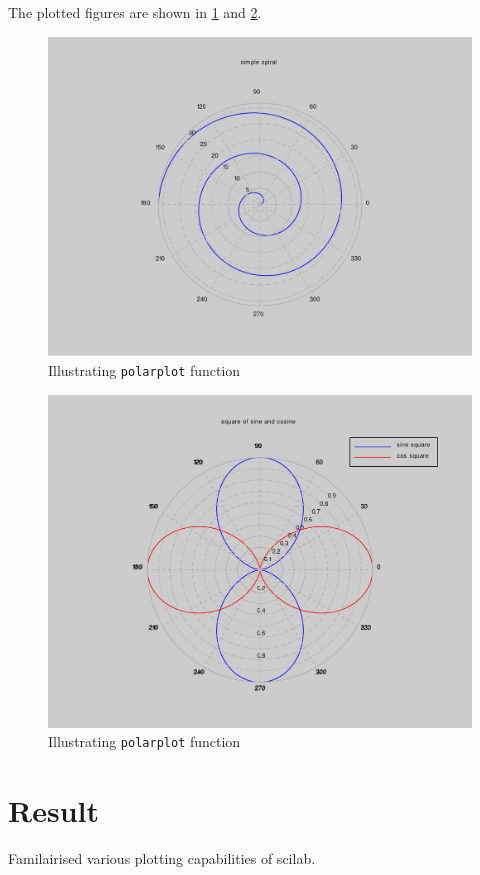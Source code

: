 The plotted figures are shown in \ref{spiral} and \ref{sinSquare}.

\begin{figure}
\includegraphics[scale=.5]{scilabCode/spiral.pdf}
\caption{Illustrating \texttt{polarplot} function}
\label{spiral}
\end{figure}

\begin{figure}
\includegraphics[scale=.5]{scilabCode/sinSquare.pdf}
\caption{Illustrating \texttt{polarplot} function}
\label{sinSquare}
\end{figure}

\section*{Result}

Familairised various plotting capabilities of scilab.
